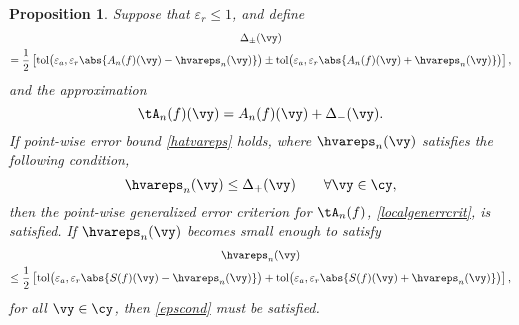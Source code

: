 \documentclass[]{elsarticle}
\DeclareMathOperator{\tol}{tol}
\newtheorem{prop}[theorem]{Proposition}
\theoremstyle{definition}
\theoremstyle{remark}
\begin{document}
\begin{prop} Suppose that $\varepsilon_r \le 1$, and define 
\begin{multline} \label{Deltadef}
\Delta_{\pm}(\vy)\\
= \frac{1}{2}\left[\tol\bigl(\varepsilon_a, \varepsilon_r \abs{A_n(f)(\vy)-\hvareps_n(\vy)}\bigr) \pm \tol\bigl(\varepsilon_a, \varepsilon_r \abs{A_n(f)(\vy)+\hvareps_n(\vy)}\bigr) \right],
\end{multline}
and the approximation 
\begin{equation} \label{tAdef}
\tA_n(f)(\vy) = A_n(f)(\vy) + \Delta_-(\vy).
\end{equation}
If point-wise error bound \eqref{hatvareps} holds, where $\hvareps_n(\vy)$ satisfies the following condition,
\begin{equation} \label{epscond}
\hvareps_n(\vy) \le \Delta_+(\vy) \qquad \forall \vy \in \cy,
\end{equation}
then the point-wise generalized error criterion for $\tA_n(f)$, \eqref{localgenerrcrit}, is satisfied.  If $\hvareps_n(\vy)$ becomes small enough to satisfy
\begin{multline} \label{suffepscond}
\hvareps_n(\vy) \\
\le \frac{1}{2}\left[\tol\bigl(\varepsilon_a, \varepsilon_r \abs{S(f)(\vy)-\hvareps_n(\vy)}\bigr) + \tol\bigl(\varepsilon_a, \varepsilon_r \abs{S(f)(\vy)+\hvareps_n(\vy)}\bigr) \right],
\end{multline}
for all $\vy \in \cy$, then \eqref{epscond} must be satisfied.
\end{prop}
\end{document}
